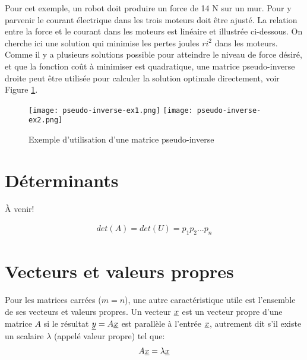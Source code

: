 \newpage
\begin{example}
Pour cet exemple, un robot doit produire un force de 14 N sur un mur. Pour y parvenir le courant électrique dans les trois moteurs doit être ajusté. La relation entre la force et le courant dans les moteurs est linéaire et illustrée ci-dessous. On cherche ici une solution qui minimise les pertes joules $ri^2$ dans les moteurs. Comme il y a plusieurs solutions possible pour atteindre le niveau de force désiré, et que la fonction coût à minimiser est quadratique, une matrice pseudo-inverse droite peut être utilisée pour calculer la solution optimale directement, voir Figure \ref{fig:pseudo-inverse-ex1}.
\begin{figure}[H]
	\centering
		\texttt{[image: pseudo-inverse-ex1.png]}
		\texttt{[image: pseudo-inverse-ex2.png]}
	\caption{Exemple d'utilisation d'une matrice pseudo-inverse}
	\label{fig:pseudo-inverse-ex1}
\end{figure}
\end{example}



\newpage
\section{Déterminants}

À venir!

\begin{align}
det(A) = det(U) = p_1 p_2 ... p_n
\end{align}

\newpage
\section{Vecteurs et valeurs propres}

Pour les matrices carrées ($m=n$), une autre caractéristique utile est l'ensemble de ses vecteurs et valeurs propres. Un vecteur $\underline{x}$ est un vecteur propre d'une matrice $A$ si le résultat $\underline{y} = A \underline{x}$ est parallèle à l'entrée $\underline{x}$, autrement dit s'il existe un scalaire $\lambda$ (appelé valeur propre) tel que:
\begin{align}
A \underline{x} = \lambda  \underline{x}
\end{align}

